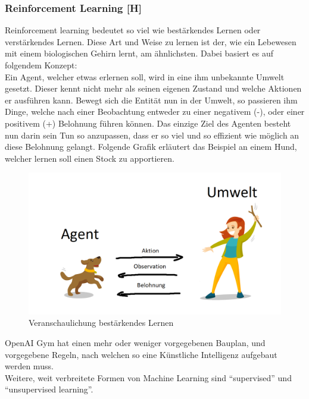\subsubsection{Reinforcement Learning [H]}\label{tech:reinfLearning:header}
Reinforcement learning bedeutet so viel wie bestärkendes Lernen oder verstärkendes Lernen.
Diese Art und Weise zu lernen ist der, wie ein Lebewesen mit einem biologischen Gehirn
lernt, am ähnlichsten.
Dabei basiert es auf folgendem Konzept: \\
Ein Agent, welcher etwas erlernen soll, wird in eine ihm unbekannte Umwelt gesetzt. Dieser kennt nicht mehr
als seinen eigenen Zustand und welche Aktionen er ausführen kann. Bewegt sich die Entität nun in der
Umwelt, so passieren ihm Dinge, welche nach einer Beobachtung entweder zu einer negativem (-), oder einer
positivem (+) Belohnung führen können. Das einzige Ziel des Agenten besteht nun darin sein Tun so anzupassen, dass
er so viel und so
effizient wie möglich an diese Belohnung gelangt. Folgende Grafik erläutert das Beispiel an einem Hund,
welcher lernen soll einen Stock zu apportieren.

\begin{figure}[H]
    \centering
    \includegraphics[scale=0.4]{pics/reinforcementLearningConcept.png}
    \caption{Veranschaulichung bestärkendes Lernen \cite{tech:reinforcementlearningDog:cite}}
    \label{tech:fig:reinfconcept}
\end{figure}

OpenAI Gym hat einen mehr oder weniger vorgegebenen Bauplan, und vorgegebene Regeln, nach welchen
so eine Künstliche Intelligenz aufgebaut werden muss. \\
Weitere, weit verbreitete Formen von Machine Learning sind ``supervised'' und ``unsupervised learning''.

